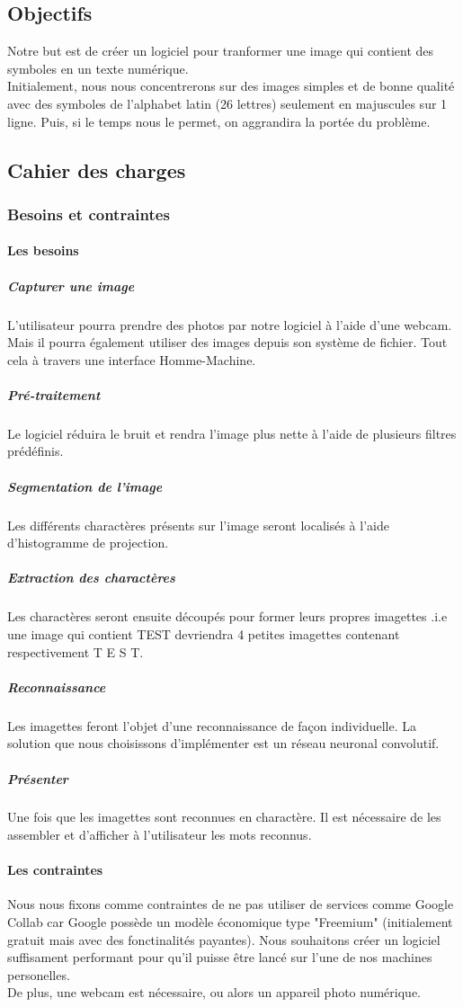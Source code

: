\documentclass[a4paper]{article}
\begin{document}
		\subsection{Objectifs}
			Notre but est de créer un logiciel pour tranformer une image qui contient des symboles en un texte numérique.\\
			Initialement, nous nous concentrerons sur des images simples et de bonne qualité avec des symboles de l'alphabet latin (26 lettres) seulement en majuscules sur 1 ligne. Puis, si le temps nous le permet, on aggrandira la portée du problème.
		\subsection{Cahier des charges}
			\subsubsection{Besoins et contraintes}
				\paragraph{Les besoins}
					\subparagraph{Capturer une image}
						L'utilisateur pourra prendre des photos par notre logiciel à l'aide d'une webcam. Mais il pourra également utiliser des images depuis son système de fichier. Tout cela à travers une interface Homme-Machine.
					\subparagraph{Pré-traitement}
						Le logiciel réduira le bruit et rendra l'image plus nette à l'aide de plusieurs filtres prédéfinis. 
					\subparagraph{Segmentation de l'image}
						Les différents charactères présents sur l'image seront localisés à l'aide d'histogramme de projection.
					\subparagraph{Extraction des charactères}
						Les charactères seront ensuite découpés pour former leurs propres imagettes .i.e une image qui contient TEST devriendra 4 petites imagettes contenant respectivement T E S T.
					\subparagraph{Reconnaissance}
						Les imagettes feront l'objet d'une reconnaissance de façon individuelle. La solution que nous choisissons d'implémenter est un réseau neuronal convolutif.
					\subparagraph{Présenter}
						Une fois que les imagettes sont reconnues en charactère. Il est nécessaire de les assembler et d'afficher à l'utilisateur les mots reconnus.
				\paragraph{Les contraintes}
					Nous nous fixons comme contraintes de ne pas utiliser de services comme Google Collab car Google possède un modèle économique type "Freemium" (initialement gratuit mais avec des fonctinalités payantes). Nous souhaitons créer un logiciel suffisament performant pour qu'il puisse être lancé sur l'une de nos machines personelles. \\De plus, une webcam est nécessaire, ou alors un appareil photo numérique.
\end{document}
